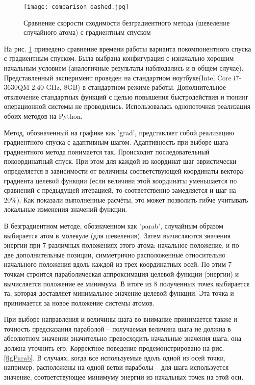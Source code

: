   \begin{figure}
  \begin{center}
  \texttt{[image: comparison\_dashed.jpg]}
  \end{center}
  \caption{Сравнение скорости сходимости безградиентного метода (шевеление случайного атома) с градиентным спуском}
   \label{Compare}
  \end{figure}

  На рис. \ref{Compare} приведено сравнение времени работы варианта покомпонентного спуска с градиентным спуском. Была выбрана конфигурация с изначально хорошим начальным условием (аналогичные результаты наблюдались и в общем случае). Представленный эксперимент проведен на стандартном ноутбуке(Intel Core i7-3630QM 2.40 GHz, 8GB) в стандартном режиме работы. Дополнительное отключение стандартных функций с целью повышения быстродействия и тюнинг операционной системы не проводились. Использовалась однопоточная реализация обоих методов на Python.

  Метод, обозначенный на графике как 'grad', представляет собой реализацию градиентного спуска с адаптивным шагом. Адаптивность при выборе шага градиентного метода понимается так. Происходит последовательный покоординатный спуск. При этом для каждой из координат шаг эвристически определяется в зависимости от величины соответствующей координаты вектора-градиента целевой функции (если величина этой координаты уменьшается по сравнений с предыдущей итерацией, то соответственно замедляется и шаг на 20\%). Как показали выполненные расчёты, это может позволить гибче учитывать локальные изменения значений функции. 

  В безградиентном методе, обозначенном как 'parab', случайным образом выбирается атом в молекуле (для шевеления). Затем вычисляются значения энергии при 7 различных положениях этого атома: начальное положение, и по две дополнительные позиции, симметрично расположенные относительно начального положения вдоль каждой из трех координатных осей. По этим 7 точкам строится параболическая аппроксимация целевой функции (энергии) и вычисляется положение ее минимума. В итоге из 8 полученных точек выбирается та, которая доставляет минимальное значение целевой функции. Эта точка и принимается за новое положение системы атомов. 
  \iffalse
  По каждой из осей проводится экстраполяция параболой в зависимости от минимума которой и определяется возможная длина шага вдоль данной оси. После из полученных минимумов выбирается наименьший по значению энергии, который и используется для смещения выбранного атома. Иллюстрация одной итерации подобного подхода изображена на рис. \ref{figParab}. 
  \fi
  \iffalse
  При выборе направления и величины шага во внимание принимается также и точность предсказания параболой -- получаемая величина шага не должна в абсолютном значении значительно превосходить начальные значения шага, она должна уточнить его. Корректное поведение продемонстрировано на 
  рис. \ref{figParab}. 
  В случаях, когда все используемые вдоль одной из осей точки, например, расположены на одной ветви параболы -- для шага используется значение, соответствующее минимуму энергии из начальных точек на этой оси.


